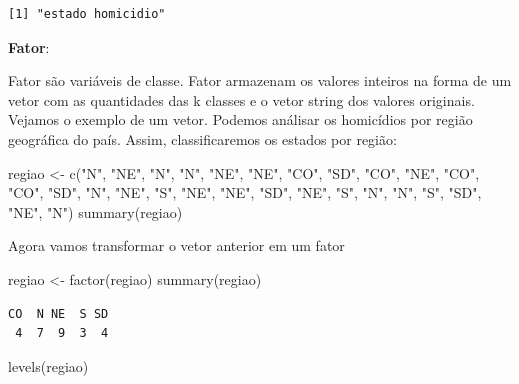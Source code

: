 \documentclass[
  letterpaper,
  DIV=11,
  numbers=noendperiod]{scrreprt}
\newenvironment{Shaded}{\begin{snugshade}}{\end{snugshade}}
\newcommand{\FunctionTok}[1]{\textcolor[rgb]{0.28,0.35,0.67}{#1}}
\newcommand{\NormalTok}[1]{\textcolor[rgb]{0.00,0.23,0.31}{#1}}
\newcommand{\OtherTok}[1]{\textcolor[rgb]{0.00,0.23,0.31}{#1}}
\newcommand{\StringTok}[1]{\textcolor[rgb]{0.13,0.47,0.30}{#1}}
\begin{document}
\begin{verbatim}
[1] "estado homicidio"
\end{verbatim}

\textbf{Fator}:

Fator são variáveis de classe. Fator armazenam os valores inteiros na
forma de um vetor com as quantidades das k classes e o vetor string dos
valores originais. Vejamos o exemplo de um vetor. Podemos análisar os
homicídios por região geográfica do país. Assim, classificaremos os
estados por região:

\begin{Shaded}
\begin{Highlighting}[]
\NormalTok{regiao }\OtherTok{\textless{}{-}} \FunctionTok{c}\NormalTok{(}\StringTok{"N"}\NormalTok{,  }\StringTok{"NE"}\NormalTok{,  }\StringTok{"N"}\NormalTok{,  }\StringTok{"N"}\NormalTok{,  }\StringTok{"NE"}\NormalTok{,  }\StringTok{"NE"}\NormalTok{,  }\StringTok{"CO"}\NormalTok{,  }\StringTok{"SD"}\NormalTok{,  }\StringTok{"CO"}\NormalTok{,  }\StringTok{"NE"}\NormalTok{,  }\StringTok{"CO"}\NormalTok{,  }\StringTok{"CO"}\NormalTok{,  }\StringTok{"SD"}\NormalTok{,  }\StringTok{"N"}\NormalTok{,  }\StringTok{"NE"}\NormalTok{,  }\StringTok{"S"}\NormalTok{,  }\StringTok{"NE"}\NormalTok{,  }\StringTok{"NE"}\NormalTok{,  }\StringTok{"SD"}\NormalTok{,  }\StringTok{"NE"}\NormalTok{,  }\StringTok{"S"}\NormalTok{,  }\StringTok{"N"}\NormalTok{,  }\StringTok{"N"}\NormalTok{,  }\StringTok{"S"}\NormalTok{,  }\StringTok{"SD"}\NormalTok{,  }\StringTok{"NE"}\NormalTok{,  }\StringTok{"N"}\NormalTok{)}
\FunctionTok{summary}\NormalTok{(regiao)}
\end{Highlighting}
\end{Shaded}

Agora vamos transformar o vetor anterior em um fator

\begin{Shaded}
\begin{Highlighting}[]
\NormalTok{regiao }\OtherTok{\textless{}{-}} \FunctionTok{factor}\NormalTok{(regiao)}
\FunctionTok{summary}\NormalTok{(regiao)}
\end{Highlighting}
\end{Shaded}

\begin{verbatim}
CO  N NE  S SD 
 4  7  9  3  4 
\end{verbatim}

\begin{Shaded}
\begin{Highlighting}[]
\FunctionTok{levels}\NormalTok{(regiao)}
\end{Highlighting}
\end{Shaded}
\end{document}
